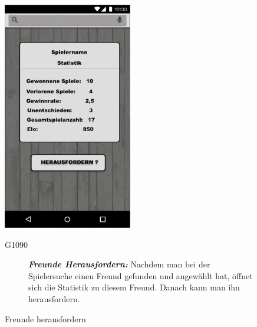 \documentclass[parskip=full]{scrartcl}
\begin{document}
\begin{figure}[htp]
	\begin{minipage}[t]{6cm}
		\vspace{0pt}
		\includegraphics[height=100mm]{spielerprofil.png}
		\caption{Freunde herausfordern}
		\label{fig:Freunde herausforern}
	\end{minipage}
	\hfill
	\begin{minipage}[t]{6cm}
		\vspace{0pt}
		\begin{description}
			\item[G1090] \textbf{\textit{Freunde Herausfordern: }} Nachdem man bei der Spielersuche einen Freund gefunden und angewählt hat, öffnet sich die Statistik zu diesem Freund. Danach kann man ihn herausfordern.
		\end{description}
	\end{minipage}


\end{figure}
\end{document}
